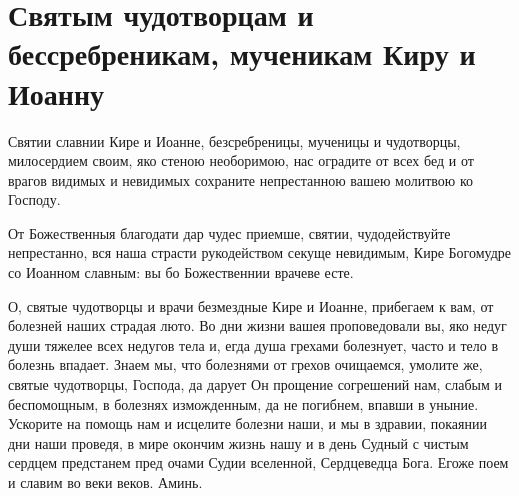 \section{Святым чудотворцам и бессребреникам, мученикам Киру и Иоанну}\begin{mymulticols}


Святии славнии Кире и Иоанне, безсребреницы, мученицы и чудотворцы, милосердием своим, яко стеною необоримою, нас оградите от всех бед и от врагов видимых и невидимых сохраните непрестанною вашею молитвою ко Господу.


От Божественныя благодати дар чудес приемше, святии, чудодействуйте непрестанно, вся наша страсти рукодейством секуще невидимым, Кире Богомудре со Иоанном славным: вы бо Божественнии врачеве есте.


О, святые чудотворцы и врачи безмездные Кире и Иоанне, прибегаем к вам, от болезней наших страдая люто. Во дни жизни вашея проповедовали вы, яко недуг души тяжелее всех недугов тела и, егда душа грехами болезнует, часто и тело в болезнь впадает. Знаем мы, что болезнями от грехов очищаемся, умолите же, святые чудотворцы, Господа, да дарует Он прощение согрешений нам, слабым и беспомощным, в болезнях изможденным, да не погибнем, впавши в уныние. Ускорите на помощь нам и исцелите болезни наши, и мы в здравии, покаянии дни наши проведя, в мире окончим жизнь нашу и в день Судный с чистым сердцем предстанем пред очами Судии вселенной, Сердцеведца Бога. Егоже поем и славим во веки веков. Аминь.

\end{mymulticols}

\mychapterending


